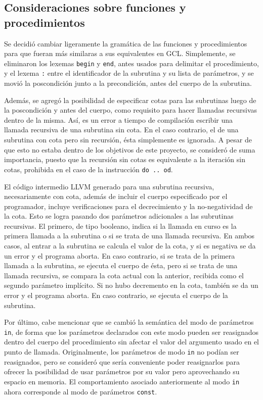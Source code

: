\subsection{Consideraciones sobre funciones y procedimientos}

Se decidió cambiar ligeramente la gramática de las funciones y procedimientos
para que fueran más similaras a sus equivalentes en GCL. Simplemente, se
eliminaron los lexemas \texttt{begin} y \texttt{end}, antes usados para
delimitar el procedimiento, y el lexema \texttt{:} entre el identificador de la
subrutina y su lista de parámetros, y se movió la poscondición junto a la
precondición, antes del cuerpo de la subrutina.

Además, se agregó la posibilidad de especificar cotas para las subrutinas luego
de la poscondición y antes del cuerpo, como requisito para hacer llamadas
recursivas dentro de la misma. Así, es un error a tiempo de compilación escribir
una llamada recursiva de una subrutina sin cota. En el caso contrario, el de una
subrutina con cota pero sin recursión, ésta simplemente es ignorada. A pesar de
que esto no estaba dentro de los objetivos de este proyecto, se consideró de
suma importancia, puesto que la recursión sin cotas es equivalente a la
iteración sin cotas, prohibida en el caso de la instrucción \texttt{do .. od}.

El código intermedio LLVM generado para una subrutina recursiva, necesariamente
con cota, además de incluir el cuerpo especificado por el programador, incluye
verificaciones para el decrecimiento y la no-negatividad de la cota. Esto se
logra pasando dos parámetros adicionales a las subrutinas recursivas. El
primero, de tipo booleano, indica si la llamada en curso es la primera llamada a
la subrutina o si se trata de una llamada recursiva. En ambos casos, al entrar a
la subrutina se calcula el valor de la cota, y si es negativa se da un error y
el programa aborta. En caso contrario, si se trata de la primera llamada a la
subrutina, se ejecuta el cuerpo de ésta, pero si se trata de una llamada
recursiva, se compara la cota actual con la anterior, recibida como el segundo
parámetro implícito. Si no hubo decremento en la cota, también se da un error y
el programa aborta. En caso contrario, se ejecuta el cuerpo de la subrutina.

Por último, cabe mencionar que se cambió la semántica del modo de parámetros
\texttt{in}, de forma que los parámetros declarados con este modo pueden ser
reasignados dentro del cuerpo del procedimiento sin afectar el valor del
argumento usado en el punto de llamada. Originalmente, los parámetros de modo
\texttt{in} no podían ser reasignados, pero se consideró que sería conveniente
poder reasignarlos para ofrecer la posibilidad de usar parámetros por su valor
pero aprovechando su espacio en memoria. El comportamiento asociado
anteriormente al modo \texttt{in} ahora corresponde al modo de parámetros
\texttt{const}.

